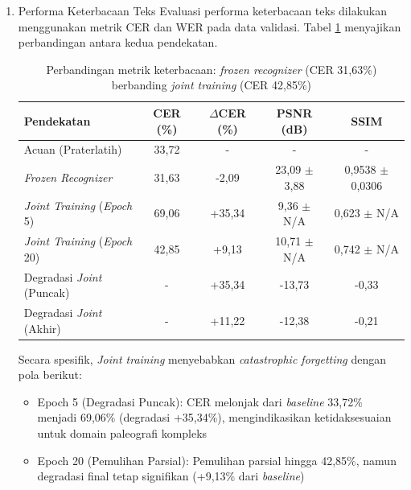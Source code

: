 \documentclass[12pt,a4paper]{article}
\begin{document}
\begin{enumerate}[leftmargin=1.5em, labelsep=0.5em, itemindent=0pt, noitemsep, topsep=0pt, label=\arabic*., leftmargin=0.8cm]
    \item Performa Keterbacaan Teks
          Evaluasi performa keterbacaan teks dilakukan menggunakan metrik CER dan WER pada data validasi. Tabel \ref{tab:frozen-vs-joint-cer} menyajikan perbandingan antara kedua pendekatan.
          \begin{table}[!htbp]
              \small
              \caption[Metrik keterbacaan frozen berbanding joint]{Perbandingan metrik keterbacaan: \textit{frozen recognizer} (CER 31,63\%) berbanding \textit{joint training} (CER 42,85\%)}
              \label{tab:frozen-vs-joint-cer}
              \begin{tabularx}{\textwidth}{|>{\raggedright\arraybackslash}X|c|c|c|c|}
                  \toprule
                  \textbf{Pendekatan}                & \textbf{CER (\%)} & \textbf{$\Delta$CER (\%)} & \textbf{PSNR (dB)}        & \textbf{SSIM}                \\
                  \midrule
                  Acuan (Praterlatih)    & 33,72    & -                & -                & -                   \\
                  \textit{Frozen Recognizer}         & 31,63    & -2,09            & 23,09 $\pm$ 3,88 & 0,9538 $\pm$ 0,0306 \\
                  \textit{Joint Training} (\textit{Epoch} 5)  & 69,06    & +35,34           & 9,36 $\pm$ N/A   & 0,623 $\pm$ N/A     \\
                  \textit{Joint Training} (\textit{Epoch} 20) & 42,85    & +9,13            & 10,71 $\pm$ N/A  & 0,742 $\pm$ N/A     \\
                  \midrule
                  Degradasi \textit{Joint} (Puncak)    & -        & +35,34           & -13,73           & -0,33               \\
                  Degradasi \textit{Joint} (Akhir)   & -        & +11,22           & -12,38           & -0,21               \\
                  \bottomrule
              \end{tabularx}
          \end{table}

          Secara spesifik, \textit{Joint training} menyebabkan \textit{catastrophic forgetting} dengan pola berikut:
          \begin{itemize}[nosep]
              \item Epoch 5 (Degradasi Puncak): CER melonjak dari \textit{baseline} 33,72\% menjadi 69,06\% (degradasi +35,34\%), mengindikasikan ketidaksesuaian untuk domain paleografi kompleks
              \item Epoch 20 (Pemulihan Parsial): Pemulihan parsial hingga 42,85\%, namun degradasi final tetap signifikan (+9,13\% dari \textit{baseline})
          \end{itemize}


\end{enumerate}
\end{document}
